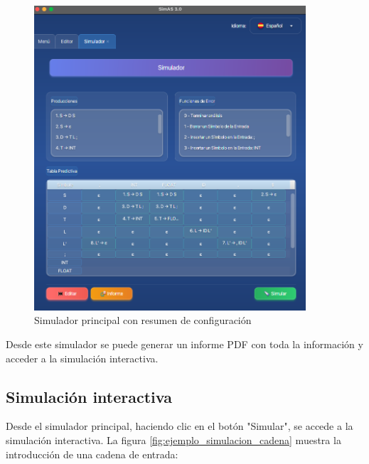 \needspace{8cm}
\begin{figure}[H]
    \centering
    \includegraphics[width=0.9\textwidth]{figuras/ejemplo_practico/simulador.png}
    \caption{Simulador principal con resumen de configuración}
    \label{fig:ejemplo_simulador_principal}
\end{figure}

Desde este simulador se puede generar un informe PDF con toda la información y acceder a la simulación interactiva.

\subsection{Simulación interactiva}

Desde el simulador principal, haciendo clic en el botón \string"Simular\string", se accede a la simulación interactiva. La figura \ref{fig:ejemplo_simulacion_cadena} muestra la introducción de una cadena de entrada:

